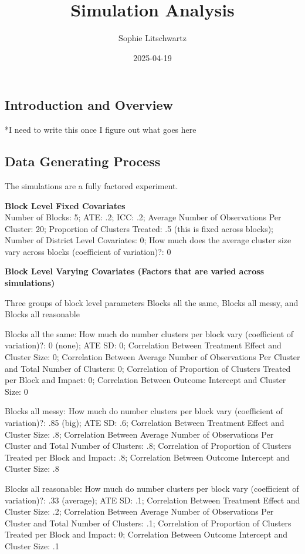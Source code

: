 \documentclass[
]{article}
\title{Simulation Analysis}
\author{Sophie Litschwartz}
\date{2025-04-19}
\begin{document}
\maketitle

\subsection{Introduction and Overview}\label{introduction-and-overview}

*I need to write this once I figure out what goes here

\subsection{Data Generating Process}\label{data-generating-process}

The simulations are a fully factored experiment.

\textbf{Block Level Fixed Covariates}\\
Number of Blocks: 5; ATE: .2; ICC: .2; Average Number of Observations
Per Cluster: 20; Proportion of Clusters Treated: .5 (this is fixed
across blocks); Number of District Level Covariates: 0; How much does
the average cluster size vary across blocks (coefficient of variation)?:
0

\textbf{Block Level Varying Covariates (Factors that are varied across
simulations)}

Three groups of block level parameters Blocks all the same, Blocks all
messy, and Blocks all reasonable

Blocks all the same: How much do number clusters per block vary
(coefficient of variation)?: 0 (none); ATE SD: 0; Correlation Between
Treatment Effect and Cluster Size: 0; Correlation Between Average Number
of Observations Per Cluster and Total Number of Clusters: 0; Correlation
of Proportion of Clusters Treated per Block and Impact: 0; Correlation
Between Outcome Intercept and Cluster Size: 0

Blocks all messy: How much do number clusters per block vary
(coefficient of variation)?: .85 (big); ATE SD: .6; Correlation Between
Treatment Effect and Cluster Size: .8; Correlation Between Average
Number of Observations Per Cluster and Total Number of Clusters: .8;
Correlation of Proportion of Clusters Treated per Block and Impact: .8;
Correlation Between Outcome Intercept and Cluster Size: .8

Blocks all reasonable: How much do number clusters per block vary
(coefficient of variation)?: .33 (average); ATE SD: .1; Correlation
Between Treatment Effect and Cluster Size: .2; Correlation Between
Average Number of Observations Per Cluster and Total Number of Clusters:
.1; Correlation of Proportion of Clusters Treated per Block and Impact:
0; Correlation Between Outcome Intercept and Cluster Size: .1
\end{document}
